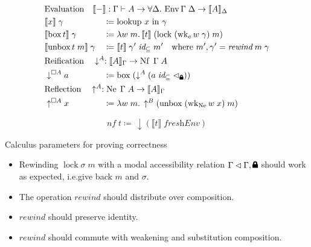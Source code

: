 \documentclass{beamer}
\newcommand{\lock}{\text{\tikz[baseline]{
      \fill[rounded corners=.1ex] (-.75ex,0) rectangle (.75ex,1ex);
      \draw[line width=.3ex] (-.4ex,.5ex) -- ++(0,.75ex) arc (180:0:.4ex) -- ++(0,-.75ex);
}}}
\begin{document}
\begin{frame}
  \begin{align*}
    &\mathrlap{\text{Evaluation} \quad \llbracket-\rrbracket : \Gamma \vdash A \to \forall\Delta.\, \operatorname{Env} \Gamma \; \Delta \to \llbracket A \rrbracket_\Delta} &&\\
    &\llbracket x \rrbracket \; \gamma &&\coloneqq \text{lookup } x \text{ in } \gamma \\
    &\llbracket \operatorname{box} t \rrbracket \; \gamma &&\coloneqq \lambda w \; m.\, \llbracket t \rrbracket \; (\operatorname{lock} \; (\operatorname{wk}_e w \; \gamma) \; m) \\
    &\llbracket \operatorname{unbox} t \; m \rrbracket \; \gamma &&\coloneqq \llbracket t \rrbracket \; \gamma' \; \textit{id}_\subseteq \; m' \quad \text{where } m' , \gamma' = \textit{rewind} \; m \; \gamma \\
    &\mathrlap{\text{Reification} \quad \downarrow^A : \llbracket A \rrbracket_\Gamma \to \operatorname{Nf} \; \Gamma \; A} &&\\
    &\downarrow^{\Box A} a &&\coloneqq \operatorname{box} \; (\downarrow^A (a \; \textit{id}_\subseteq \; \lhd_\lock)) \\
    &\mathrlap{\text{Reflection} \quad \uparrow^A : \operatorname{Ne} \; \Gamma \; A \to \llbracket A \rrbracket_\Gamma} &&\\
    &\uparrow^{\Box A} x &&\coloneqq \lambda w \; m.\, \uparrow^B (\operatorname{unbox} \; (\operatorname{wk}_{\operatorname{Ne}} w \; x) \; m)
  \end{align*}

  $$ nf \; t \coloneqq\, \downarrow (\llbracket t \rrbracket \; \textit{freshEnv}) $$
\end{frame}

\begin{frame}{Calculus parameters for proving correctness}
  \begin{itemize}
  \item Rewinding $\operatorname{lock} \sigma \; m$
    with a modal accessibility relation $\Gamma \lhd \Gamma, \lock$
    should work as expected, i.e.\@ give back $m$ and $\sigma$.
  \item The operation $\textit{rewind}$ should distribute over composition.
  \item $\textit{rewind}$ should preserve identity.
  \item $\textit{rewind}$ should commute with weakening and substitution composition.
  \end{itemize}
\end{frame}
\end{document}
